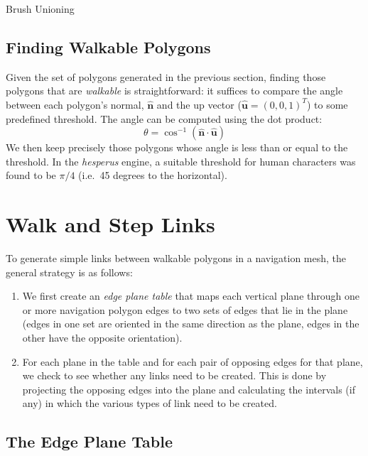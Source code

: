 \documentclass[10pt,twocolumn]{article}
\begin{document}
\begin{stulisting}[t]
\caption{Brush Unioning}
\label{code:brush-unioning}

\end{stulisting}

\subsection{Finding Walkable Polygons}

Given the set of polygons generated in the previous section, finding those polygons that are \emph{walkable} is straightforward: it suffices to compare the angle between each polygon's normal, $\mathbf{\hat{n}}$ and the up vector ($\mathbf{\hat{u}} = (0,0,1)^T$) to some predefined threshold. The angle can be computed using the dot product:
%
\[
\theta = \cos^{-1} \left( \mathbf{\hat{n}} \cdot \mathbf{\hat{u}} \right)
\]
%
We then keep precisely those polygons whose angle is less than or equal to the threshold. In the \emph{hesperus} engine, a suitable threshold for human characters was found to be $\pi/4$ (i.e.~45 degrees to the horizontal).

\section{Walk and Step Links}
\label{sec:walkstep}

To generate simple links between walkable polygons in a navigation mesh, the general strategy is as follows:
%
\begin{enumerate}
\item We first create an \emph{edge plane table} that maps each vertical plane through one or more navigation polygon edges to two sets of edges that lie in the plane (edges in one set are oriented in the same direction as the plane, edges in the other have the opposite orientation).
\item For each plane in the table and for each pair of opposing edges for that plane, we check to see whether any links need to be created. This is done by projecting the opposing edges into the plane and calculating the intervals (if any) in which the various types of link need to be created.
\end{enumerate}

\subsection{The Edge Plane Table}
\end{document}

